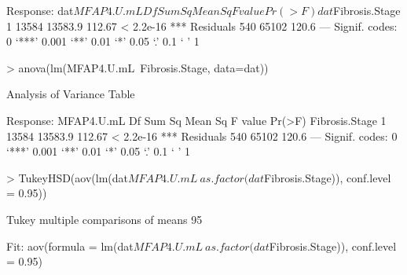 \documentclass{article}
\begin{document}
\begin{enumerate}
\begin{Schunk}
\begin{Soutput}
Response: dat$MFAP4.U.mL
                    Df Sum Sq Mean Sq F value    Pr(>F)    
dat$Fibrosis.Stage   1  13584 13583.9  112.67 < 2.2e-16 ***
Residuals          540  65102   120.6                      
---
Signif. codes:  0 ‘***’ 0.001 ‘**’ 0.01 ‘*’ 0.05 ‘.’ 0.1 ‘ ’ 1
\end{Soutput}
\begin{Sinput}
> anova(lm(MFAP4.U.mL~Fibrosis.Stage, data=dat))
\end{Sinput}
\begin{Soutput}
Analysis of Variance Table

Response: MFAP4.U.mL
                Df Sum Sq Mean Sq F value    Pr(>F)    
Fibrosis.Stage   1  13584 13583.9  112.67 < 2.2e-16 ***
Residuals      540  65102   120.6                      
---
Signif. codes:  0 ‘***’ 0.001 ‘**’ 0.01 ‘*’ 0.05 ‘.’ 0.1 ‘ ’ 1
\end{Soutput}
\begin{Sinput}
> TukeyHSD(aov(lm(dat$MFAP4.U.mL~as.factor(dat$Fibrosis.Stage)), conf.level = 0.95))
\end{Sinput}
\begin{Soutput}
  Tukey multiple comparisons of means
    95%

Fit: aov(formula = lm(dat$MFAP4.U.mL ~ as.factor(dat$Fibrosis.Stage)), conf.level = 0.95)


\end{Soutput}
\end{Schunk}
\end{enumerate}
\end{document}
